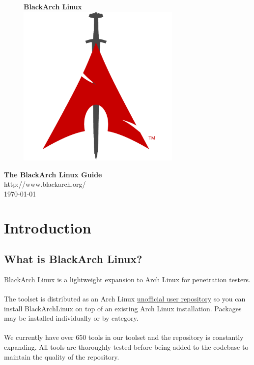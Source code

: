 \documentclass[a4paper, oneside, 11pt]{book}
\begin{document}
\pagestyle{empty}
\begin{center}
\begin{figure}[htbp]
\centering
\vspace{1cm}
\Huge{\textbf{BlackArch \color{red}Linux}}\\
\vspace{2cm}
\includegraphics[width=8cm]{logo.png}
\label{fig:logo}
\end{figure}
\vspace{1cm}
\Huge{\textbf{The BlackArch Linux Guide}}\\
\vspace{1cm}
\Large{\color{red}http://www.blackarch.org/}\\
\vspace{0.5cm}
\Large{\today}
\end{center}
\newpage
\tableofcontents
\newpage
\pagestyle{fancy}


\chapter{Introduction}

\section{What is BlackArch Linux?}
\href{http://www.blackarch.org}{BlackArch Linux} is a lightweight expansion to
Arch Linux for penetration testers.
\\\\
The toolset is distributed as an Arch Linux
\href{https://wiki.archlinux.org/index.php/Unofficial\_User\_Repositories}
{unofficial user repository} so you can install BlackArchLinux on top of an
existing Arch Linux installation. Packages may be installed individually or by
category.
\\\\
We currently have over 650 tools in our toolset and the repository is constantly
expanding. All tools are thoroughly tested before being added to the codebase to
maintain the quality of the repository.
\end{document}
